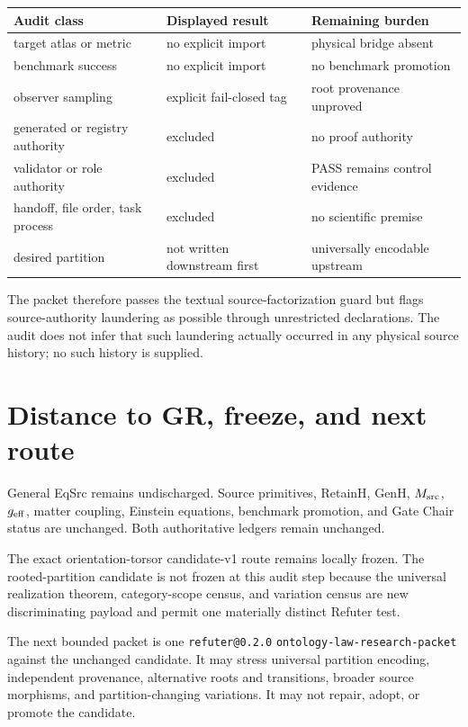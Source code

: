 \documentclass[11pt]{article}
\begin{document}
\begin{center}
\begin{tabular}{lll}
\toprule
Audit class & Displayed result & Remaining burden \\
\midrule
target atlas or metric & no explicit import & physical bridge absent \\
benchmark success & no explicit import & no benchmark promotion \\
observer sampling & explicit fail-closed tag & root provenance unproved \\
generated or registry authority & excluded & no proof authority \\
validator or role authority & excluded & PASS remains control evidence \\
handoff, file order, task process & excluded & no scientific premise \\
desired partition & not written downstream first & universally encodable upstream \\
\bottomrule
\end{tabular}
\end{center}

The packet therefore passes the textual source-factorization guard but flags
source-authority laundering as possible through unrestricted declarations.
The audit does not infer that such laundering actually occurred in any
physical source history; no such history is supplied.

\section{Distance to GR, freeze, and next route}

General EqSrc remains undischarged. Source primitives, RetainH, GenH,
\(M_{\rm src}\), \(g_{\rm eff}\), matter coupling, Einstein equations,
benchmark promotion, and Gate Chair status are unchanged. Both authoritative
ledgers remain unchanged.

The exact orientation-torsor candidate-v1 route remains locally frozen. The
rooted-partition candidate is not frozen at this audit step because the
universal realization theorem, category-scope census, and variation census are
new discriminating payload and permit one materially distinct Refuter test.

The next bounded packet is one \texttt{refuter@0.2.0}
\texttt{ontology-law-research-packet} against the unchanged candidate. It may
stress universal partition encoding, independent provenance, alternative
roots and transitions, broader source morphisms, and partition-changing
variations. It may not repair, adopt, or promote the candidate.
\end{document}
